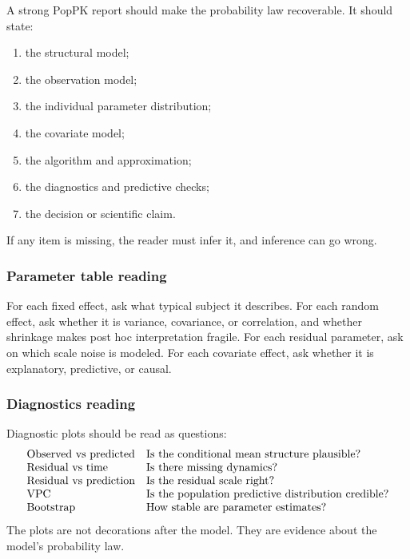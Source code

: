 A strong PopPK report should make the probability law recoverable.  It should state:
\begin{enumerate}[leftmargin=2em]
  \item the structural model;
  \item the observation model;
  \item the individual parameter distribution;
  \item the covariate model;
  \item the algorithm and approximation;
  \item the diagnostics and predictive checks;
  \item the decision or scientific claim.
\end{enumerate}
If any item is missing, the reader must infer it, and inference can go wrong.

\subsubsection*{Parameter table reading}

For each fixed effect, ask what typical subject it describes.  For each random effect, ask whether it is variance, covariance, or correlation, and whether shrinkage makes post hoc interpretation fragile.  For each residual parameter, ask on which scale noise is modeled.  For each covariate effect, ask whether it is explanatory, predictive, or causal.

\subsubsection*{Diagnostics reading}

Diagnostic plots should be read as questions:
\[
  \begin{array}{ll}
  \text{Observed vs predicted} & \text{Is the conditional mean structure plausible?}\\
  \text{Residual vs time} & \text{Is there missing dynamics?}\\
  \text{Residual vs prediction} & \text{Is the residual scale right?}\\
  \mathrm{VPC} & \text{Is the population predictive distribution credible?}\\
  \text{Bootstrap} & \text{How stable are parameter estimates?}
  \end{array}
\]
The plots are not decorations after the model.  They are evidence about the model's probability law.
